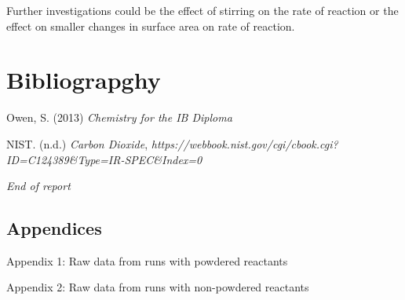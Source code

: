 \documentclass[twoside]{article}
\begin{document}
	Further investigations could be the effect of stirring on the rate of reaction or the effect on smaller changes in surface area on rate of reaction.

\newpage
\section*{Bibliograpghy}
	Owen, S. (2013) \emph{Chemistry for the IB Diploma}

	NIST. (n.d.) \emph{Carbon Dioxide}, \emph{https://webbook.nist.gov/cgi/cbook.cgi?ID=C124389\&Type=IR-SPEC\&Index=0}

	\emph{End of report}

	\subsection*{Appendices}

	Appendix 1: Raw data from runs with powdered reactants

	Appendix 2: Raw data from runs with non-powdered reactants
\newpage
	
	
\end{document}
